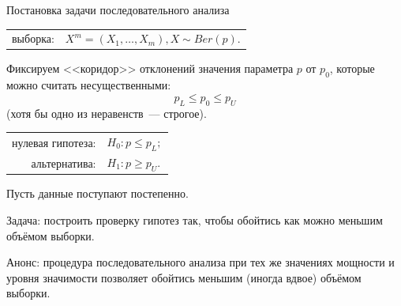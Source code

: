 \documentclass[9pt,pdf,utf8,hyperref={unicode},aspectratio=169]{beamer}
\renewcommand{\leq}{\leqslant}
\renewcommand{\geq}{\geqslant}
\begin{document}
\begin{frame}{Постановка задачи последовательного анализа}
   \begin{center}
        \begin{tabular}{rl}
            выборка:                        & $X^{m}=\left(X_{1},\ldots,X_{m}\right), X \sim Ber\left(p\right).$ \\
        \end{tabular}
   \end{center}

   \bigskip

   Фиксируем <<коридор>> отклонений значения параметра $p$ от $p_0$, которые можно считать несущественными:
   $$p_L\leq p_0\leq p_U$$
   (хотя бы одно из неравенств~--- строгое).

   \bigskip

   \begin{center}
        \begin{tabular}{rl}
            нулевая гипотеза:               & $H_0\colon p\leq p_L;$ \\
            альтернатива:                   & $H_1\colon p\geq p_U.$ \\
        \end{tabular}
   \end{center}

   \bigskip

   Пусть данные поступают постепенно.

   Задача: построить проверку гипотез так, чтобы обойтись как можно меньшим объёмом выборки.
   
   \bigskip
   
   Анонс: процедура последовательного анализа при тех же значениях мощности и уровня значимости позволяет обойтись меньшим (иногда вдвое) объёмом выборки.
\end{frame}
\end{document}
